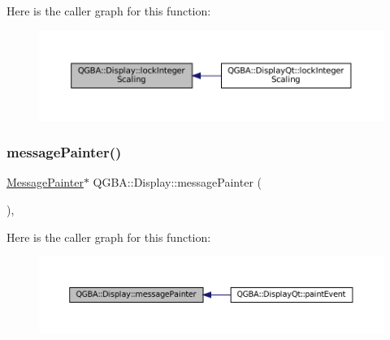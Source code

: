 Here is the caller graph for this function\+:
\nopagebreak
\begin{figure}[H]
\begin{center}
\leavevmode
\includegraphics[width=350pt]{class_q_g_b_a_1_1_display_a3d51766ed958524a3ba87a19ecc2f4f6_icgraph}
\end{center}
\end{figure}
\mbox{\label{class_q_g_b_a_1_1_display_a45e9200d5d4ca816d2e9fa9f27fce50e}} 
\subsubsection{\texorpdfstring{message\+Painter()}{messagePainter()}}
{\footnotesize\ttfamily \mbox{\hyperlink{class_q_g_b_a_1_1_message_painter}{Message\+Painter}}$\ast$ Q\+G\+B\+A\+::\+Display\+::message\+Painter (\begin{DoxyParamCaption}{ }\end{DoxyParamCaption})\hspace{0.3cm}{\ttfamily [inline]}, {\ttfamily [protected]}}

Here is the caller graph for this function\+:
\nopagebreak
\begin{figure}[H]
\begin{center}
\leavevmode
\includegraphics[width=350pt]{class_q_g_b_a_1_1_display_a45e9200d5d4ca816d2e9fa9f27fce50e_icgraph}
\end{center}
\end{figure}
\mbox{\label{class_q_g_b_a_1_1_display_a32c69ce5b7ac9aad71b34d5d269b80bf}} 
